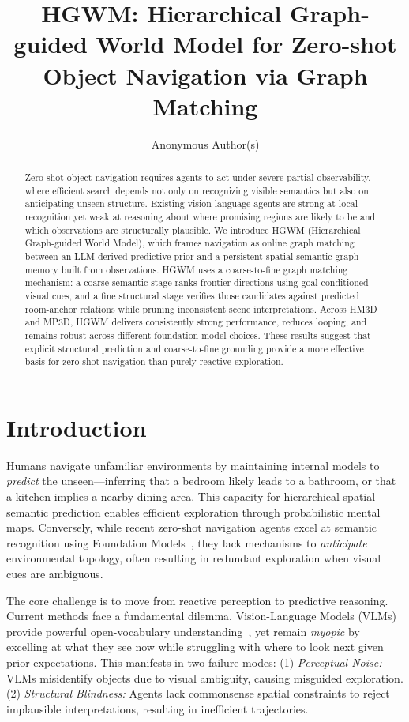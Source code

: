 \documentclass{article}
\title{HGWM: Hierarchical Graph-guided World Model for Zero-shot Object Navigation via Graph Matching}
\author{Anonymous Author(s)}
\begin{document}
\maketitle

\begin{abstract}
Zero-shot object navigation requires agents to act under severe partial observability, where efficient search depends not only on recognizing visible semantics but also on anticipating unseen structure. Existing vision-language agents are strong at local recognition yet weak at reasoning about where promising regions are likely to be and which observations are structurally plausible. We introduce HGWM (Hierarchical Graph-guided World Model), which frames navigation as online graph matching between an LLM-derived predictive prior and a persistent spatial-semantic graph memory built from observations. HGWM uses a coarse-to-fine graph matching mechanism: a coarse semantic stage ranks frontier directions using goal-conditioned visual cues, and a fine structural stage verifies those candidates against predicted room-anchor relations while pruning inconsistent scene interpretations. Across HM3D and MP3D, HGWM delivers consistently strong performance, reduces looping, and remains robust across different foundation model choices. These results suggest that explicit structural prediction and coarse-to-fine grounding provide a more effective basis for zero-shot navigation than purely reactive exploration.
\end{abstract}

\section{Introduction}

Humans navigate unfamiliar environments by maintaining internal models to \textit{predict} the unseen—inferring that a bedroom likely leads to a bathroom, or that a kitchen implies a nearby dining area. This capacity for hierarchical spatial-semantic prediction enables efficient exploration through probabilistic mental maps. Conversely, while recent zero-shot navigation agents excel at semantic recognition using Foundation Models~\citep{yin2025unigoal,nie2025wmnav}, they lack mechanisms to \textit{anticipate} environmental topology, often resulting in redundant exploration when visual cues are ambiguous.

The core challenge is to move from reactive perception to predictive reasoning. Current methods face a fundamental dilemma. Vision-Language Models (VLMs) provide powerful open-vocabulary understanding~\citep{majumdar2022zson,nie2025wmnav}, yet remain \textit{myopic} by excelling at what they see now while struggling with where to look next given prior expectations. This manifests in two failure modes: (1) \textit{Perceptual Noise:} VLMs misidentify objects due to visual ambiguity, causing misguided exploration. (2) \textit{Structural Blindness:} Agents lack commonsense spatial constraints to reject implausible interpretations, resulting in inefficient trajectories.
\end{document}
